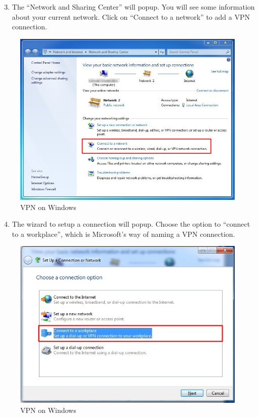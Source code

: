 \begin{enumerate}[1.]
\setcounter{enumi}{2}
\item
  The ``Network and Sharing Center'' will popup. You will see some
  information about your current network. Click on ``Connect to a
  network'' to add a VPN connection.
\end{enumerate}
\begin{figure}[htbp]
\centering
\includegraphics{vpn_windows_02.jpg}
\caption{VPN on Windows}
\end{figure}

\begin{enumerate}[1.]
\setcounter{enumi}{3}
\item
  The wizard to setup a connection will popup. Choose the option to
  ``connect to a workplace'', which is Microsoft's way of naming a VPN
  connection.
\end{enumerate}
\begin{figure}[htbp]
\centering
\includegraphics{vpn_windows_03.jpg}
\caption{VPN on Windows}
\end{figure}

